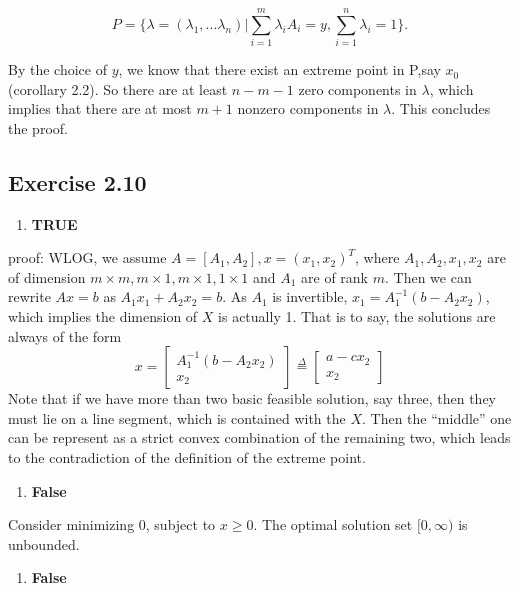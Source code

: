 \documentclass[11pt]{article}
\providecommand{\tightlist}{%
      \setlength{\itemsep}{0pt}\setlength{\parskip}{0pt}}
\begin{document}
\[
P = \{\lambda=(\lambda_1,...\lambda_n)| \sum_{i=1}^m \lambda_i A_i=y, \sum_{i=1}^n \lambda_i = 1\}.
\]

By the choice of \(y\), we know that there exist an extreme point in
P,say \(x_0\) (corollary 2.2). So there are at least \(n-m-1\) zero
components in \(\lambda\), which implies that there are at most \(m+1\)
nonzero components in \(\lambda\). This concludes the proof.

    \hypertarget{exercise-2.10}{%
\subsection{Exercise 2.10}\label{exercise-2.10}}

\begin{enumerate}
\def\labelenumi{\alph{enumi})}
\tightlist
\item
  \textbf{TRUE}
\end{enumerate}

proof: WLOG, we assume \(A=[A_1, A_2], x=(x_1,x_2)^T\), where
\(A_1, A_2, x_1, x_2\) are of dimension
\(m\times m, m\times 1, m\times 1, 1\times 1\) and \(A_1\) are of rank
\(m\). Then we can rewrite \(Ax=b\) as \(A_1x_1 + A_2x_2=b\). As \(A_1\)
is invertible, \(x_1=A_1^{-1}(b-A_2x_2)\), which implies the dimension
of \(X\) is actually 1. That is to say, the solutions are always of the
form \[
x= \begin{bmatrix}A_1^{-1}(b-A_2x_2) \\ x_2\end{bmatrix} \overset{\Delta}{=} \begin{bmatrix}a-cx_2 \\ x_2\end{bmatrix} 
\] Note that if we have more than two basic feasible solution, say
three, then they must lie on a line segment, which is contained with the
\(X\). Then the ``middle'' one can be represent as a strict convex
combination of the remaining two, which leads to the contradiction of
the definition of the extreme point.

\begin{enumerate}
\def\labelenumi{\alph{enumi})}
\setcounter{enumi}{1}
\tightlist
\item
  \textbf{False}
\end{enumerate}

Consider minimizing \(0\), subject to \(x\geq 0\). The optimal solution
set \([0, \infty)\) is unbounded.

\begin{enumerate}
\def\labelenumi{\alph{enumi})}
\setcounter{enumi}{2}
\tightlist
\item
  \textbf{False}
\end{enumerate}
\end{document}
